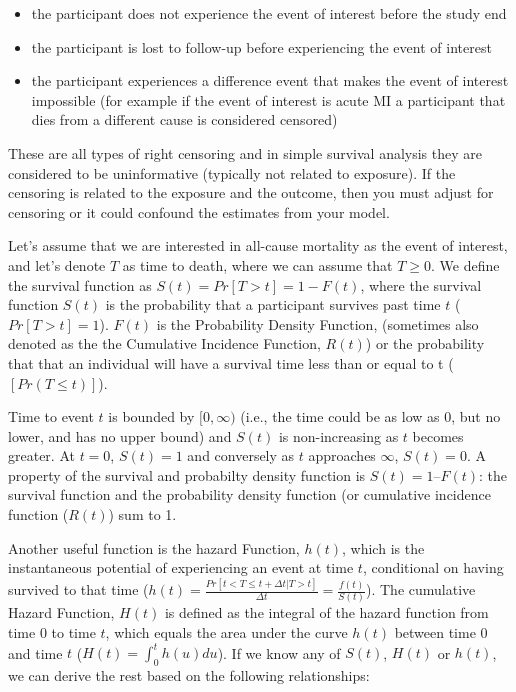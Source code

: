 \documentclass[
]{book}
\providecommand{\tightlist}{%
  \setlength{\itemsep}{0pt}\setlength{\parskip}{0pt}}
\begin{document}
\begin{itemize}
\tightlist
\item
  the participant does not experience the event of interest before the study end
\item
  the participant is lost to follow-up before experiencing the event of interest
\item
  the participant experiences a difference event that makes the event of interest impossible (for example if the event of interest is acute MI a participant that dies from a different cause is considered censored)
\end{itemize}

These are all types of right censoring and in simple survival analysis they are considered to be uninformative (typically not related to exposure). If the censoring is related to the exposure and the outcome, then you must adjust for censoring or it could confound the estimates from your model.

Let's assume that we are interested in all-cause mortality as the event of interest, and let's denote \(T\) as time to death, where we can assume that \(T\geq 0\). We define the survival function as
\(S(t)=Pr[T>t]=1-F(t)\), where the survival function \(S(t)\) is the probability that a participant survives past time \(t\) (\(Pr[T>t]=1\)). \(F(t)\) is the Probability Density Function, (sometimes also denoted as the the Cumulative Incidence Function, \(R(t)\)) or the probability that that an individual will have a survival time less than or equal to t (\([Pr(T≤t)]\)).

Time to event \(t\) is bounded by \([0,\infty)\) (i.e., the time could be as low as 0, but no lower, and has no upper bound) and \(S(t)\) is non-increasing as \(t\) becomes greater. At \(t=0\), \(S(t)=1\) and conversely as \(t\) approaches \(\infty\), \(S(t)=0\). A property of the survival and probabilty density function is \(S(t) = 1 – F(t)\): the survival function and the probability density function (or cumulative incidence function (\(R(t)\)) sum to 1.

Another useful function is the hazard Function, \(h(t)\), which is the instantaneous potential of experiencing an event at time \(t\), conditional on having survived to that time (\(h(t)=\frac{Pr[t<T\leq t+\Delta t|T>t]}{\Delta t}=\frac{f(t)}{S(t)}\)). The cumulative Hazard Function, \(H(t)\) is defined as the integral of the hazard function from time \(0\) to time \(t\), which equals the area under the curve \(h(t)\) between time \(0\) and time \(t\) (\(H(t)=\int_{0}^{t}h(u)du\)).
If we know any of \(S(t)\), \(H(t)\) or \(h(t)\), we can derive the rest based on the following relationships:
\end{document}
